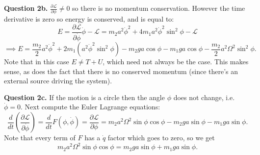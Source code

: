 \documentclass[letterpaper, reqno,11pt]{article}
\begin{document}
{\noindent\bf Question 2b.} $\frac{\partial\mathcal L}{\partial \phi}\neq 0$ so there is no momentum conservation. However the time derivative is zero so energy is conserved, and is equal to: 
\[
E=\frac{\partial\mathcal L}{\partial \dot \phi}\dot\phi-\mathcal L=m_2a^2\dot\phi^2+4m_1a^2\dot\phi^2\sin^2\phi-\mathcal L
\]
\[
\implies E=\frac{m_2}{2}a^2\dot\phi^2+2m_1\left( a^2\dot\phi^2\sin^2\phi \right)-m_2ga\cos\phi-m_1ga\cos\phi-\frac{m_2}{2}a^2\Omega^2\sin^2\phi
.\]
Note that in this case $E\neq T+U$, which need not always be the case. This makes sense, as does the fact that there is no conserved momentum (since there's an external source driving the system). 

{\noindent\bf Question 2c.} If the motion is a circle then the angle $\phi$ does not change, i.e. $\dot\phi=0$. Next compute the Euler Lagrange equations: 
\[
\frac{d}{dt}\left( \frac{\partial \mathcal L}{\partial \dot\phi} \right)=\frac{d}{dt}F(\phi, \dot\phi)=\frac{\partial\mathcal L}{\partial \phi}=m_2a^2\Omega^2\sin\phi\cos\phi-m_2ga\sin\phi-m_1ga\sin\phi
.\]
Note that every term of $F$ has a $\dot q$ factor which goes to zero, so we get
 \[
m_2a^2\Omega^2\sin\phi\cos\phi=m_2ga\sin\phi+m_1ga\sin\phi
.\]
\end{document}
